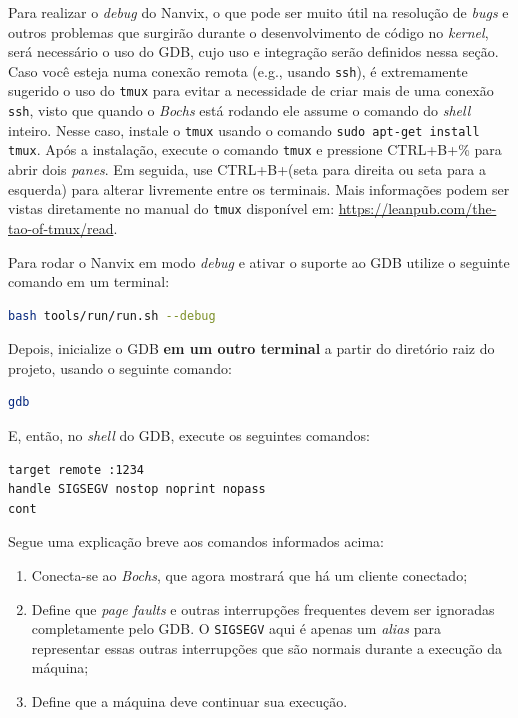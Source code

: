 \documentclass[11pt]{article}
\begin{document}
Para realizar o \textit{debug} do Nanvix, o que pode ser muito útil na resolução de \textit{bugs} e outros problemas que surgirão durante o desenvolvimento de código no \textit{kernel}, será necessário o uso do GDB, cujo uso e integração serão definidos nessa seção. Caso você esteja numa conexão remota (e.g., usando \texttt{ssh}), é extremamente sugerido o uso do \texttt{tmux} para evitar a necessidade de criar mais de uma conexão \texttt{ssh}, visto que quando o \textit{Bochs} está rodando ele assume o comando do \textit{shell} inteiro. Nesse caso, instale o \texttt{tmux} usando o comando \texttt{sudo apt-get install tmux}. Após a instalação, execute o comando \texttt{tmux} e pressione CTRL+B+\% para abrir dois \textit{panes}. Em seguida, use CTRL+B+(seta para direita ou seta para a esquerda) para alterar livremente entre os terminais. Mais informações podem ser vistas diretamente no manual do \texttt{tmux} disponível em: \url{https://leanpub.com/the-tao-of-tmux/read}.

Para rodar o Nanvix em modo \textit{debug} e ativar o suporte ao GDB utilize o seguinte comando em um terminal: \\

\begin{lstlisting}[language=bash,numbers=none,frame=single]
bash tools/run/run.sh --debug
\end{lstlisting}

Depois, inicialize o GDB \textbf{em um outro terminal} a partir do diretório raiz do projeto, usando o seguinte comando: \\

\begin{lstlisting}[language=bash,numbers=none,frame=single]
gdb
\end{lstlisting}

E, então, no \textit{shell} do GDB, execute os seguintes comandos:\\

\begin{lstlisting}[language=sh,numbers=none,frame=single]
target remote :1234
handle SIGSEGV nostop noprint nopass
cont
\end{lstlisting}

Segue uma explicação breve aos comandos informados acima:

\begin{enumerate}
	\item Conecta-se ao \textit{Bochs}, que agora mostrará que há um cliente conectado;
	\item Define que \textit{page faults} e outras interrupções frequentes devem ser ignoradas completamente pelo GDB. O \texttt{SIGSEGV} aqui é apenas um \textit{alias} para representar essas outras interrupções que são normais durante a execução da máquina;
	\item Define que a máquina deve continuar sua execução.
\end{enumerate}
\end{document}
